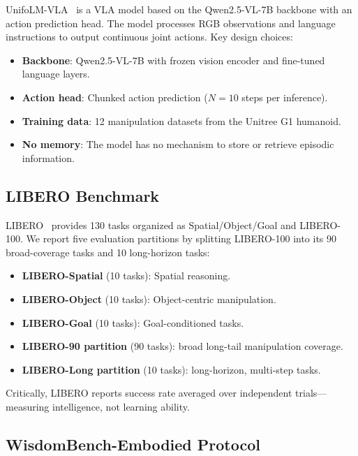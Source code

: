 ﻿\documentclass{article}
\begin{document}
UnifoLM-VLA~\citep{unitree2026unifolm} is a VLA model based on the Qwen2.5-VL-7B backbone with an action prediction head.
The model processes RGB observations and language instructions to output continuous joint actions.
Key design choices:

\begin{itemize}[leftmargin=*,itemsep=1pt]
    \item \textbf{Backbone}: Qwen2.5-VL-7B with frozen vision encoder and fine-tuned language layers.
    \item \textbf{Action head}: Chunked action prediction ($N=10$ steps per inference).
    \item \textbf{Training data}: 12 manipulation datasets from the Unitree G1 humanoid.
    \item \textbf{No memory}: The model has no mechanism to store or retrieve episodic information.
\end{itemize}

\subsection{LIBERO Benchmark}

LIBERO~\citep{liu2024libero} provides 130 tasks organized as Spatial/Object/Goal and LIBERO-100. We report five evaluation partitions by splitting LIBERO-100 into its 90 broad-coverage tasks and 10 long-horizon tasks:

\begin{itemize}[leftmargin=*,itemsep=1pt]
    \item \textbf{LIBERO-Spatial} (10 tasks): Spatial reasoning.
    \item \textbf{LIBERO-Object} (10 tasks): Object-centric manipulation.
    \item \textbf{LIBERO-Goal} (10 tasks): Goal-conditioned tasks.
    \item \textbf{LIBERO-90 partition} (90 tasks): broad long-tail manipulation coverage.
    \item \textbf{LIBERO-Long partition} (10 tasks): long-horizon, multi-step tasks.
\end{itemize}

Critically, LIBERO reports success rate averaged over independent trials---measuring intelligence, not learning ability.

\subsection{WisdomBench-Embodied Protocol}
\end{document}
